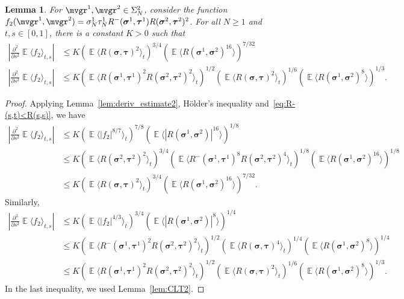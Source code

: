 \documentclass[letterpaper,11pt,reqno]{amsart}
\newtheorem{lem}[thm]{Lemma}
\renewcommand{\le}{\leqslant}
\renewcommand{\leq}{\leqslant}
\renewcommand{\geq}{\geqslant}
\newcommand{\ra}{\rangle}
\newcommand{\la}{\langle}
\newcommand{\abs}[1]{\left\vert#1\right\vert}
\newcommand{\mvgs}{\boldsymbol{\sigma}}\newcommand{\mvgS}{\boldsymbol{\Sigma}}\newcommand{\mvgt}{\boldsymbol{\tau}}
\DeclareMathOperator{\E}{\mathds{E}}
\begin{document}
\begin{lem}\label{lem:CLT3}
    For \(\mvgr^1, \mvgr^2 \in \Sigma_{N}^2\), consider the function \(f_2(\mvgr^1, \mvgr^2) = \sigma_N^1 \tau_N^1 R^-(\mvgs^1, \mvgt^1) R(\mvgs^2, \mvgt^2)^2 \).
    For all \(N \geq 1\) and \(t,s \in [0,1]\), there is a constant \(K > 0\) such that
    \begin{align}\label{eq:lem_CLT3_1}
        \abs{ \frac{\partial^2}{\partial s^2} \E \la f_2 \ra_{t,s} }
        &\leq K (\E \la R(\mvgs, \mvgt)^{2} \ra_t )^{3/4} (\E \la R(\mvgs^1, \mvgs^2)^{16} \ra )^{7/32}\\
        \abs{ \frac{\partial^2}{\partial s^2} \E \la f_2 \ra_{t,s} }
        &\le K (\E \la R(\mvgs^1, \mvgt^1)^{2} R(\mvgs^2, \mvgt^2)^2 \ra_t )^{1/2} (\E \la R(\mvgs, \mvgt)^{2} \ra_t )^{1/6} (\E \la R(\mvgs^1, \mvgs^2)^{8} \ra )^{1/3}.    \label{eq:lem_CLT3_2}
    \end{align}
\end{lem}
\begin{proof}
    Applying Lemma~\ref{lem:deriv_estimate2}, H\"older's inequality and~\eqref{eq:R-(s,t)<R(s,s)}, we have
    \begin{align*}
         \abs{ \frac{\partial^2}{\partial s^2} \E \la f_2 \ra_{t,s} }
         &\leq K (\E \la \abs{f_2}^{8/7} \ra_{t} )^{7/8} (\E \la \abs{R(\mvgs^1, \mvgs^2)}^{16} \ra )^{1/8} \\
         &\leq K (\E \la R(\mvgs^2, \mvgt^2)^{2} \ra_t )^{3/4} (\E \la R^-(\mvgs^1, \mvgt^1)^{8} R(\mvgs^2, \mvgt^2)^{4} \ra_t )^{1/8} (\E \la R(\mvgs^1, \mvgs^2)^{16} \ra )^{1/8} \\
         &\leq K (\E \la R(\mvgs, \mvgt)^{2} \ra_t )^{3/4} (\E \la R(\mvgs^1, \mvgs^2)^{16} \ra )^{7/32}.
    \end{align*}
    Similarly,
    \begin{align*}
         \abs{ \frac{\partial^2}{\partial s^2} \E \la f_2 \ra_{t,s} }
         &\leq K (\E \la \abs{f_2}^{4/3} \ra_{t} )^{3/4} (\E \la \abs{R(\mvgs^1, \mvgs^2)}^{8} \ra )^{1/4} \\
         &\leq K (\E \la R^-(\mvgs^1, \mvgt^1)^{2} R(\mvgs^2, \mvgt^2)^2 \ra_t )^{1/2} (\E \la R(\mvgs, \mvgt)^{4} \ra_t )^{1/4} (\E \la R(\mvgs^1, \mvgs^2)^{8} \ra )^{1/4} \\
         &\leq K (\E \la R(\mvgs^1, \mvgt^1)^{2} R(\mvgs^2, \mvgt^2)^2 \ra_t )^{1/2} (\E \la R(\mvgs, \mvgt)^{2} \ra_t )^{1/6} (\E \la R(\mvgs^1, \mvgs^2)^{8} \ra )^{1/3}.
    \end{align*}
    In the last inequality, we used Lemma~\ref{lem:CLT2}.
\end{proof}
\end{document}
